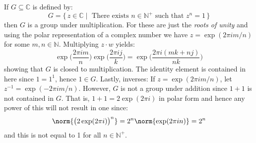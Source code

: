 \documentclass{article}                                                        %
\begin{document}
        \begin{example}
            If $G\subseteq\mathbb{C}$ is defined by:
            \begin{equation}
                G=\{\,z\in\mathbb{C}\;|\;
                    \textrm{ There exists }n\in\mathbb{N}^{+}
                    \textrm{ such that }z^{n}=1\,\}
            \end{equation}
            then $G$ is a group under multiplication. For these are just the
            \textit{roots of unity} and using the polar representation of a
            complex number we have $z=\exp(2\pi{i}m/n)$ for some
            $m,n\in\mathbb{N}$. Multiplying $z\cdot{w}$ yields:
            \begin{equation}
                \exp\Big(\frac{2\pi{i}m}{n}\Big)
                    \exp\Big(\frac{2\pi{i}j}{k}\Big)
                =\exp\Big(\frac{2\pi{i}(mk+nj)}{nk}\Big)
            \end{equation}
            showing that $G$ is closed to multiplication. The identity element
            is contained in here since $1=1^{1}$, hence $1\in{G}$. Lastly,
            inverses: If $z=\exp(2\pi{i}m/n)$, let
            $z^{\minus{1}}=\exp(\minus{2}\pi{i}m/n)$. However, $G$ is not a
            group under addition since $1+1$ is not contained in $G$.
            That is, $1+1=2\exp(2\pi{i})$ in polar form and hence any power of
            this will not result in one since:
            \begin{equation}
                \norm{\big(2\exp(2\pi{i})\big)^{n}}
                =2^{n}\norm{\exp(2\pi{i}n)}=2^{n}
            \end{equation}
            and this is not equal to 1 for all $n\in\mathbb{N}^{+}$.
        \end{example}
\end{document}
